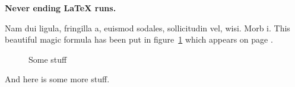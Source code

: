 \documentclass{article}
\begin{document}
\begin{center}
  \Large\bfseries Never ending \LaTeX{} runs.
\end{center}

\lipsum[1-3]


Nam dui ligula, fringilla a, euismod sodales, sollicitudin
vel, wisi. Morb i. This beautiful magic formula has been put in
figure~\ref{table} which appears on page \pageref{table}.


\begin{figure}[ht!]
  \centering
  \fbox{\rule{0pt}{4cm}\rule{5cm}{0pt}}
  \caption {Some stuff}
  \label{table}
\end{figure}

And here is some more stuff.
\end{document}

